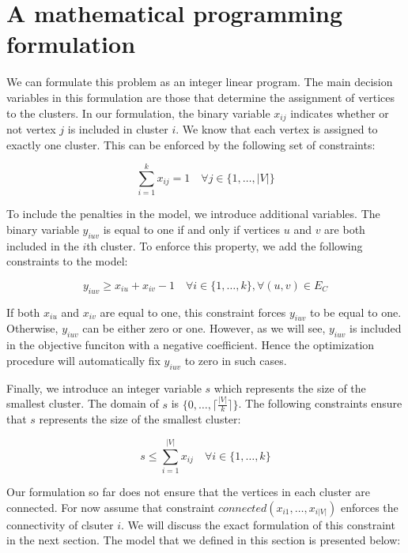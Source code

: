 \documentclass[]{article}
\begin{document}
\section{A mathematical programming formulation}
\label{sec:formulation}

We can formulate this problem as an integer linear program. The main
decision variables in this formulation are those that determine the
assignment of vertices to the clusters. In our formulation, the binary
variable $x_{ij}$ indicates whether or not vertex $j$ is included in
cluster $i$. We know that each vertex is assigned to exactly one
cluster. This can be enforced by the following set of constraints:

\begin{equation}
\sum_{i=1}^k x_{ij} = 1 \quad \forall j \in \{1, \ldots, |V|\}
\end{equation}

To include the penalties in the model, we introduce additional
variables. The binary variable $y_{iuv}$ is equal to one if and only if
vertices $u$ and $v$ are both included in the $i$th cluster. To enforce
this property, we add the following constraints to the model:

\begin{equation}
y_{iuv} \geq x_{iu} + x_{iv} -1 \quad \forall i \in \{1, \ldots, k\}, \forall (u, v) \in E_{C}
\end{equation}

If both $x_{iu}$ and $x_{iv}$ are equal to one, this constraint forces
$y_{iuv}$ to be equal to one. Otherwise, $y_{iuv}$ can be either zero or
one. However, as we will see, $y_{iuv}$ is included in the objective
funciton with a negative coefficient. Hence the optimization procedure
will automatically fix $y_{iuv}$ to zero in such cases.

Finally, we introduce an integer variable $s$ which represents the size
of the smallest cluster. The domain of $s$ is
$\{0, \ldots, \lceil \frac{|V|}{k} \rceil \}$. The following constraints
ensure that $s$ represents the size of the smallest cluster:

\begin{equation}
s \leq \sum_{i=1}^{|V|} x_{ij} \quad \forall i \in \{1, \ldots, k\}
\end{equation}

Our formulation so far does not ensure that the vertices in each cluster
are connected. For now assume that constraint
$connected(x_{i1}, \ldots, x_{i|V|})$ enforces the connectivity of
clsuter $i$. We will discuss the exact formulation of this constraint in
the next section. The model that we defined in this section is presented
below:
\end{document}
